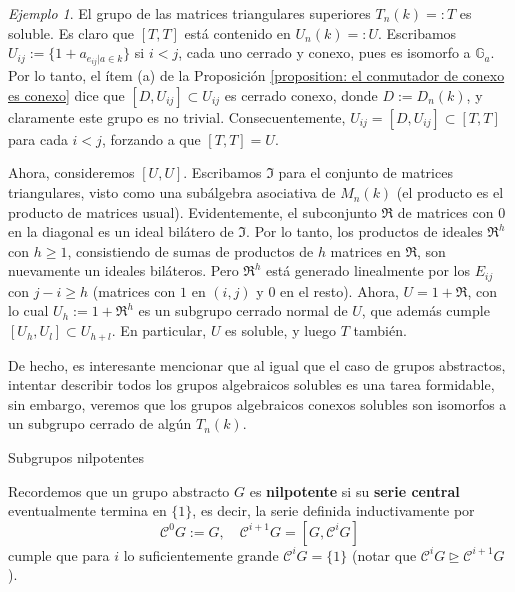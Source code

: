 \documentclass[spanish,10pt]{amsart}
\makeatletter
\renewcommand\subsection{\@startsection{subsection}{2}%
  \z@{.5\linespacing\@plus.7\linespacing}{-.5em}%
  {\normalfont\sffamily}}
\theoremstyle{definition}
\theoremstyle{remark}
\newtheorem{example}[theorem]{Ejemplo}
\numberwithin{equation}{section}
\makeatother
\begin{document}
\begin{example}\label{example:matrices triangulares superiores es soluble y el de las matrices unipontentes es nilpotente}
El grupo de las matrices triangulares superiores $T_n (k)=:T$ es soluble. Es claro que $[T,T]$ está contenido en $U_n (k) =: U$. Escribamos $U_{ij} := \{1 + a_{e_{ij} | a \in k}\}$ si $i < j$, cada uno cerrado y conexo, pues es isomorfo a $\mathbb{G}_a$. Por lo tanto, el ítem (a) de la Proposición \ref{proposition: el conmutador de conexo es conexo} dice que $[D, U_{ij}] \subset U_{ij}$ es cerrado conexo, donde $D := D_n (k)$, y claramente este grupo es no trivial. Consecuentemente, $U_{ij} = [D, U_{ij}] \subset [T,T]$ para cada $i<j$, forzando a que $[T,T] = U$.

Ahora, consideremos $[U,U]$. Escribamos $\mathfrak I$ para el conjunto de matrices triangulares, visto como una subálgebra asociativa de $M_n (k)$ (el producto es el producto de matrices usual). Evidentemente, el subconjunto $\mathfrak R$ de matrices con $0$ en la diagonal es un ideal bilátero de $\mathfrak I$. Por lo tanto, los productos de ideales $\mathfrak R^h$ con $h \geq 1$, consistiendo de sumas de productos de $h$ matrices en $\mathfrak R$, son nuevamente un ideales biláteros. Pero $\mathfrak R^h$ está generado linealmente por los $E_{ij}$ con $j - i \geq h$ (matrices con $1$ en $(i,j)$ y $0$ en el resto). Ahora, $U = 1 + \mathfrak R$, con lo cual $U_h := 1 + \mathfrak R^h$ es un subgrupo cerrado normal de $U$, que además cumple $[U_h, U_l] \subset U_{h+ l}$. En particular, $U$ es soluble, y luego $T$ también.
\end{example}

De hecho, es interesante mencionar que al igual que el caso de grupos abstractos, intentar describir todos los grupos algebraicos solubles es una tarea formidable, sin embargo, veremos que los grupos algebraicos conexos solubles son isomorfos a un subgrupo cerrado de algún $T_n (k)$.


\subsection{Subgrupos nilpotentes}


Recordemos que un grupo abstracto $G$ es \textbf{nilpotente} si su \textbf{serie central} eventualmente termina en $\{1\}$, es decir, la serie definida inductivamente por
\[
    \mathcal C ^0 G :=G, \quad \mathcal C^{i + 1} G = [ G, \mathcal C^i G]
\]
cumple que para $i$ lo suficientemente grande $\mathcal C^i G = \{1\}$ (notar que $\mathcal C ^i G \unrhd \mathcal C^{i + 1} G$).
\end{document}

